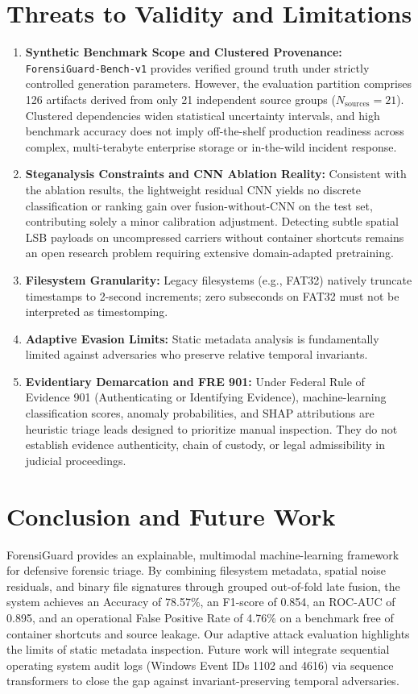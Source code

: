 \documentclass[conference]{IEEEtran}
\begin{document}
\section{Threats to Validity and Limitations}
\begin{enumerate}
    \item \textbf{Synthetic Benchmark Scope and Clustered Provenance:} \texttt{ForensiGuard-Bench-v1} provides verified ground truth under strictly controlled generation parameters. However, the evaluation partition comprises 126 artifacts derived from only 21 independent source groups ($N_{\text{sources}}=21$). Clustered dependencies widen statistical uncertainty intervals, and high benchmark accuracy does not imply off-the-shelf production readiness across complex, multi-terabyte enterprise storage or in-the-wild incident response.
    \item \textbf{Steganalysis Constraints and CNN Ablation Reality:} Consistent with the ablation results, the lightweight residual CNN yields no discrete classification or ranking gain over fusion-without-CNN on the test set, contributing solely a minor calibration adjustment. Detecting subtle spatial LSB payloads on uncompressed carriers without container shortcuts remains an open research problem requiring extensive domain-adapted pretraining.
    \item \textbf{Filesystem Granularity:} Legacy filesystems (e.g., FAT32) natively truncate timestamps to 2-second increments; zero subseconds on FAT32 must not be interpreted as timestomping.
    \item \textbf{Adaptive Evasion Limits:} Static metadata analysis is fundamentally limited against adversaries who preserve relative temporal invariants.
    \item \textbf{Evidentiary Demarcation and FRE 901:} Under Federal Rule of Evidence 901 (Authenticating or Identifying Evidence), machine-learning classification scores, anomaly probabilities, and SHAP attributions are heuristic triage leads designed to prioritize manual inspection. They do not establish evidence authenticity, chain of custody, or legal admissibility in judicial proceedings.
\end{enumerate}

\section{Conclusion and Future Work}
ForensiGuard provides an explainable, multimodal machine-learning framework for defensive forensic triage. By combining filesystem metadata, spatial noise residuals, and binary file signatures through grouped out-of-fold late fusion, the system achieves an Accuracy of 78.57\%, an F1-score of 0.854, an ROC-AUC of 0.895, and an operational False Positive Rate of 4.76\% on a benchmark free of container shortcuts and source leakage. Our adaptive attack evaluation highlights the limits of static metadata inspection. Future work will integrate sequential operating system audit logs (Windows Event IDs 1102 and 4616) via sequence transformers to close the gap against invariant-preserving temporal adversaries.
\end{document}
